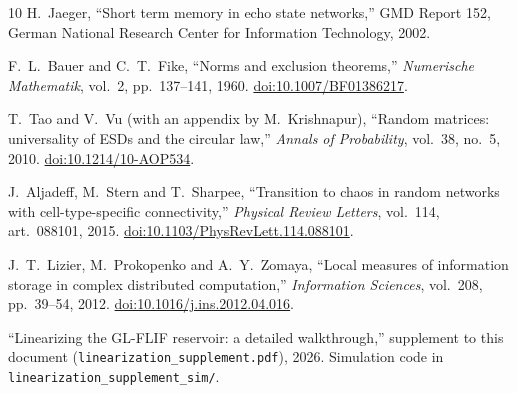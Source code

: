 \documentclass[11pt,a4paper]{article}
\begin{document}
\begin{thebibliography}{10}
H.~Jaeger,
``Short term memory in echo state networks,''
GMD Report 152, German National Research Center for Information Technology, 2002.

F.~L.~Bauer and C.~T.~Fike,
``Norms and exclusion theorems,''
\emph{Numerische Mathematik}, vol.~2, pp.~137--141, 1960.
\href{https://doi.org/10.1007/BF01386217}{doi:10.1007/BF01386217}.

T.~Tao and V.~Vu (with an appendix by M.~Krishnapur),
``Random matrices: universality of ESDs and the circular law,''
\emph{Annals of Probability}, vol.~38, no.~5, 2010.
\href{https://doi.org/10.1214/10-AOP534}{doi:10.1214/10-AOP534}.

J.~Aljadeff, M.~Stern and T.~Sharpee,
``Transition to chaos in random networks with cell-type-specific connectivity,''
\emph{Physical Review Letters}, vol.~114, art.~088101, 2015.
\href{https://doi.org/10.1103/PhysRevLett.114.088101}{doi:10.1103/PhysRevLett.114.088101}.

J.~T.~Lizier, M.~Prokopenko and A.~Y.~Zomaya,
``Local measures of information storage in complex distributed computation,''
\emph{Information Sciences}, vol.~208, pp.~39--54, 2012.
\href{https://doi.org/10.1016/j.ins.2012.04.016}{doi:10.1016/j.ins.2012.04.016}.

``Linearizing the GL-FLIF reservoir: a detailed walkthrough,''
supplement to this document (\texttt{linearization\_supplement.pdf}), 2026.
Simulation code in \texttt{linearization\_supplement\_sim/}.

\end{thebibliography}
\end{document}
